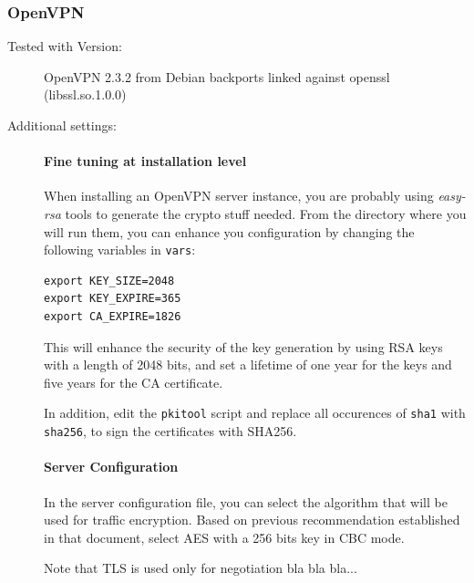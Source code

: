 \subsubsection{OpenVPN}

\begin{description}

\item[Tested with Version:] OpenVPN 2.3.2 from Debian backports linked against openssl (libssl.so.1.0.0) 



\item[Additional settings:] \mbox{}

\paragraph{Fine tuning at installation level}

When installing an OpenVPN server instance, you are probably using {\it easy-rsa} tools to generate the crypto stuff needed.
From the directory where you will run them, you can enhance you configuration by changing the following variables in \verb|vars|:

\begin{lstlisting}[breaklines]
export KEY_SIZE=2048 
export KEY_EXPIRE=365
export CA_EXPIRE=1826
\end{lstlisting}

This will enhance the security of the key generation by using RSA keys
with a length of 2048 bits, and set a lifetime of one year for the
keys and five years for the CA certificate.

In addition, edit the \verb|pkitool| script and replace all occurences
of \verb|sha1| with \verb|sha256|, to sign the certificates with
SHA256.

\paragraph{Server Configuration}

In the server configuration file, you can select the algorithm that will be used for traffic encryption.
Based on previous recommendation established in that document, select AES with a 256 bits key in CBC mode.

Note that TLS is used only for negotiation bla bla bla...


\end{description}
